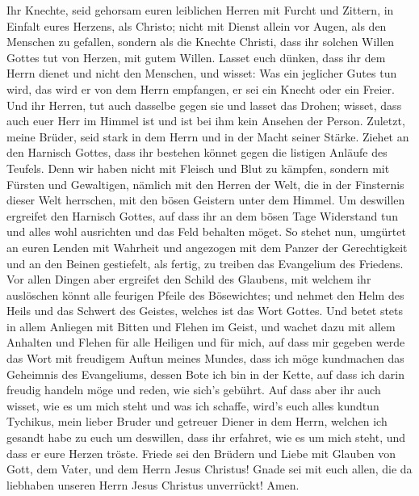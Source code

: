  Ihr Knechte, seid gehorsam euren leiblichen Herren mit
Furcht und Zittern, in Einfalt eures Herzens, als Christo;
 nicht mit Dienst allein vor Augen, als den Menschen zu
gefallen, sondern als die Knechte Christi, dass ihr solchen Willen
Gottes tut von Herzen, mit gutem Willen.  Lasset euch
dünken, dass ihr dem Herrn dienet und nicht den Menschen, 
und wisset: Was ein jeglicher Gutes tun wird, das wird er von dem Herrn
empfangen, er sei ein Knecht oder ein Freier.  Und ihr
Herren, tut auch dasselbe gegen sie und lasset das Drohen; wisset, dass
auch euer Herr im Himmel ist und ist bei ihm kein Ansehen der Person.
 Zuletzt, meine Brüder, seid stark in dem Herrn und in
der Macht seiner Stärke.  Ziehet an den Harnisch Gottes,
dass ihr bestehen könnet gegen die listigen Anläufe des Teufels.
 Denn wir haben nicht mit Fleisch und Blut zu kämpfen,
sondern mit Fürsten und Gewaltigen, nämlich mit den Herren der Welt, die
in der Finsternis dieser Welt herrschen, mit den bösen Geistern unter
dem Himmel.  Um deswillen ergreifet den Harnisch Gottes,
auf dass ihr an dem bösen Tage Widerstand tun und alles wohl ausrichten
und das Feld behalten möget.  So stehet nun, umgürtet an
euren Lenden mit Wahrheit und angezogen mit dem Panzer der Gerechtigkeit
 und an den Beinen gestiefelt, als fertig, zu treiben das
Evangelium des Friedens.  Vor allen Dingen aber ergreifet
den Schild des Glaubens, mit welchem ihr auslöschen könnt alle feurigen
Pfeile des Bösewichtes;  und nehmet den Helm des Heils
und das Schwert des Geistes, welches ist das Wort Gottes.
 Und betet stets in allem Anliegen mit Bitten und Flehen
im Geist, und wachet dazu mit allem Anhalten und Flehen für alle
Heiligen  und für mich, auf dass mir gegeben werde das
Wort mit freudigem Auftun meines Mundes, dass ich möge kundmachen das
Geheimnis des Evangeliums,  dessen Bote ich bin in der
Kette, auf dass ich darin freudig handeln möge und reden, wie sich's
gebührt.  Auf dass aber ihr auch wisset, wie es um mich
steht und was ich schaffe, wird's euch alles kundtun Tychikus, mein
lieber Bruder und getreuer Diener in dem Herrn,  welchen
ich gesandt habe zu euch um deswillen, dass ihr erfahret, wie es um mich
steht, und dass er eure Herzen tröste.  Friede sei den
Brüdern und Liebe mit Glauben von Gott, dem Vater, und dem Herrn Jesus
Christus!  Gnade sei mit euch allen, die da liebhaben
unseren Herrn Jesus Christus unverrückt! Amen.
